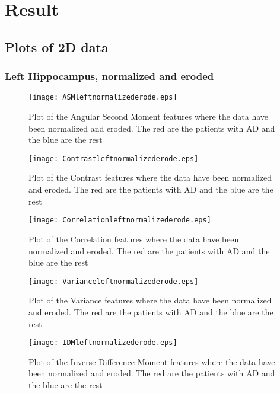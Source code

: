 \chapter{Result}

\section{Plots of 2D data}

\subsection{Left Hippocampus, normalized and eroded}

\begin{figure}[H]
  \centering
  \texttt{[image: ASMleftnormalizederode.eps]}
  \caption{Plot of the Angular Second Moment features where the data have been normalized and eroded. The red are the patients with AD and the blue are the rest}\label{fig:ASMLeftNormalizedEroded}
\end{figure}

\begin{figure}[H]
  \centering
  \texttt{[image: Contrastleftnormalizederode.eps]}
  \caption{Plot of the Contrast features where the data have been normalized and eroded. The red are the patients with AD and the blue are the rest}\label{fig:ContrastLeftNormalizedEroded}
\end{figure}

\begin{figure}[H]
  \centering
  \texttt{[image: Correlationleftnormalizederode.eps]}
  \caption{Plot of the Correlation features where the data have been normalized and eroded. The red are the patients with AD and the blue are the rest}\label{fig:Correlationleftnormalizederode}
\end{figure}

\begin{figure}[H]
  \centering
  \texttt{[image: Varianceleftnormalizederode.eps]}
  \caption{Plot of the Variance features where the data have been normalized and eroded. The red are the patients with AD and the blue are the rest}\label{fig:Varianceleftnormalizederode}
\end{figure}

\begin{figure}[H]
  \centering
  \texttt{[image: IDMleftnormalizederode.eps]}
  \caption{Plot of the Inverse Difference Moment features where the data have been normalized and eroded. The red are the patients with AD and the blue are the rest}\label{fig:IDMleftnormalizederode}
\end{figure}

